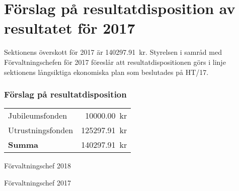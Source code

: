 \documentclass[../_main/handlingar.tex]{subfiles}
\begin{document}
\section{Förslag på resultatdisposition av resultatet för 2017}

Sektionens överskott för 2017 är \SI{140297.91}{kr}. Styrelsen i samråd med Förvaltningschefen för 2017 föreslår att resultatdispositionen görs i linje sektionens långsiktiga ekonomiska plan som beslutades på HT/17.

\subsubsection*{Förslag på resultatdisposition}
\begin{tabular}{l r}
    Jubileumsfonden & \SI{10000.00}{kr} \\
    Utrustningsfonden & \SI{125297.91}{kr} \\
    \hline
    \textbf{Summa} & \SI{140297.91}{kr} \\
\end{tabular}

\begin{signatures}{2}
    \ist
    \signature{Magnus Lundh}{Förvaltningschef 2018}
    \signature{Sophia Grimmeiss Grahm}{Förvaltningschef 2017}
\end{signatures}
\end{document}
